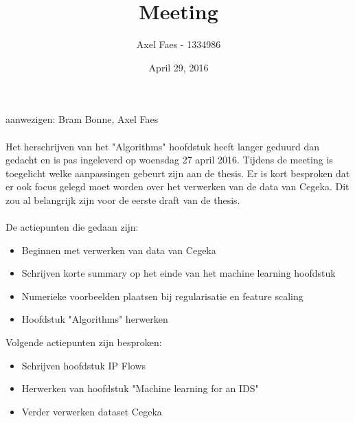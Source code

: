 \documentclass[notitlepage]{article}
\title{Meeting}
\author{Axel Faes - 1334986}
\date{April 29, 2016}
\begin{document}
\maketitle

aanwezigen: Bram Bonne, Axel Faes \\
\\
Het herschrijven van het "Algorithms" hoofdstuk heeft langer geduurd dan gedacht en is pas ingeleverd op woensdag 27 april 2016. Tijdens de meeting is toegelicht welke aanpassingen gebeurt zijn aan de thesis. Er is kort besproken dat er ook focus gelegd moet worden over het verwerken van de data van Cegeka. Dit zou al belangrijk zijn voor de eerste draft van de thesis. \\
\\
De actiepunten die gedaan zijn:
\begin{itemize}  
        \item Beginnen met verwerken van data van Cegeka
        \item Schrijven korte summary op het einde van het machine learning hoofdstuk
        \item Numerieke voorbeelden plaatsen bij regularisatie en feature scaling
        \item Hoofdstuk "Algorithms" herwerken
\end{itemize}

Volgende actiepunten zijn besproken:
\begin{itemize}  		
		\item Schrijven hoofdstuk IP Flows
		\item Herwerken van hoofdstuk "Machine learning for an IDS"
        \item Verder verwerken dataset Cegeka
\end{itemize}
\end{document}
